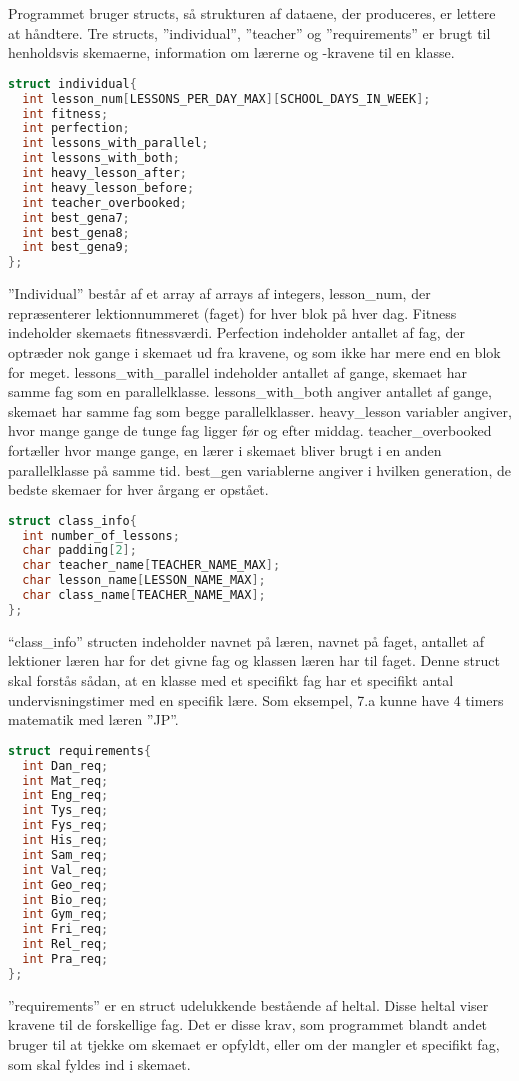 Programmet bruger structs, så strukturen af dataene, der produceres, er lettere at håndtere. Tre structs, ”individual”, ”teacher” og ”requirements” er brugt til henholdsvis skemaerne, information om lærerne og -kravene til en klasse.

\begin{lstlisting}[language = C]
struct individual{
  int lesson_num[LESSONS_PER_DAY_MAX][SCHOOL_DAYS_IN_WEEK];
  int fitness;
  int perfection;
  int lessons_with_parallel;
  int lessons_with_both;
  int heavy_lesson_after;
  int heavy_lesson_before;
  int teacher_overbooked;
  int best_gena7;
  int best_gena8;
  int best_gena9; 
};
\end{lstlisting}

”Individual” består af et array af arrays af integers, lesson\_num, der repræsenterer lektionnummeret (faget) for hver blok på hver dag. Fitness indeholder skemaets fitnessværdi. Perfection indeholder antallet af fag, der optræder nok gange i skemaet ud fra kravene, og som ikke har mere end en blok for meget. lessons\_with\_parallel indeholder antallet af gange, skemaet har samme fag som en parallelklasse. lessons\_with\_both angiver antallet af gange, skemaet har samme fag som begge parallelklasser. heavy\_lesson variabler angiver, hvor mange gange de tunge fag ligger før og efter middag. teacher\_overbooked fortæller hvor mange gange, en lærer i skemaet bliver brugt i en anden parallelklasse på samme tid. best\_gen variablerne angiver i hvilken generation, de bedste skemaer for hver årgang er opstået.

\begin{lstlisting}[language = C]
struct class_info{
  int number_of_lessons;
  char padding[2];
  char teacher_name[TEACHER_NAME_MAX];
  char lesson_name[LESSON_NAME_MAX];
  char class_name[TEACHER_NAME_MAX];  
};
\end{lstlisting}

“class\_info” structen indeholder navnet på læren, navnet på faget, antallet af lektioner læren har for det givne fag og klassen læren har til faget. Denne struct skal forstås sådan, at en klasse med et specifikt fag har et specifikt antal undervisningstimer med en specifik lære. Som eksempel, 7.a kunne have 4 timers matematik med læren ”JP”. 

\begin{lstlisting}[language = C]
struct requirements{
  int Dan_req;
  int Mat_req;
  int Eng_req;
  int Tys_req;
  int Fys_req;
  int His_req;
  int Sam_req;
  int Val_req;
  int Geo_req;
  int Bio_req;
  int Gym_req;
  int Fri_req;
  int Rel_req;
  int Pra_req;
};
\end{lstlisting}

”requirements” er en struct udelukkende bestående af heltal. Disse heltal viser kravene til de forskellige fag. Det er disse krav, som programmet blandt andet bruger til at tjekke om skemaet er opfyldt, eller om der mangler et specifikt fag, som skal fyldes ind i skemaet.
\newpage